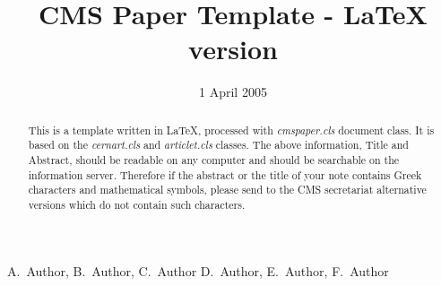 \documentclass{cmspaper}
\begin{document}

\begin{titlepage}

   \date{1 April 2005}

  \title{CMS Paper Template - LaTeX version}

  \begin{Authlist}
    A.~Author, B.~Author, C.~Author
    D.~Author, E.~Author, F.~Author
  \end{Authlist}



  \begin{abstract}
    This is a template written in LaTeX,
    processed with {\it cmspaper.cls} document class.
    It is based on the {\it cernart.cls} and {\it articlet.cls} classes.
    The above information, Title and Abstract, should be readable on any 
    computer and should be searchable on the information server. 
    Therefore if the abstract or the title of your note contains Greek 
    characters and mathematical symbols, please send to the CMS secretariat 
    alternative versions which do not contain such characters.
  \end{abstract} 

  
\end{titlepage}

\setcounter{page}{2}%
\end{document}
